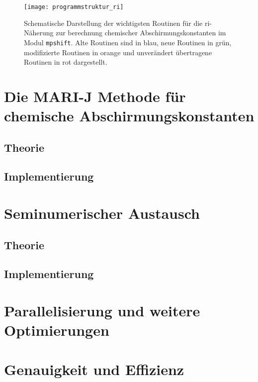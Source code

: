 \begin{figure}[ht!]
\centering
\texttt{[image: programmstruktur\_ri]}
\captionsetup{figurewithin = chapter}
\captionsetup{font=small, labelfont=bf}\caption[RI-J Routinen für chemische Abschirmungskonstanten]{Schematische Darstellung der wichtigsten Routinen für die \ac{ri}-Näherung zur berechnung chemischer Abschirmungskonstanten im Modul \texttt{mpshift}. Alte Routinen sind in blau, neue Routinen in grün, modifizierte Routinen in orange und unverändert übertragene Routinen in rot dargestellt.}
\label{abb:programmstrukur_ri}
\end{figure}

\section{Die MARI-J Methode für chemische Abschirmungskonstanten}\label{marij}
	\subsection{Theorie}
	\subsection{Implementierung}

\section{Seminumerischer Austausch}
	\subsection{Theorie}
	\subsection{Implementierung}
	
\section{Parallelisierung und weitere Optimierungen}\label{paraopt}

\section{Genauigkeit und Effizienz}\label{genauigkeit}
